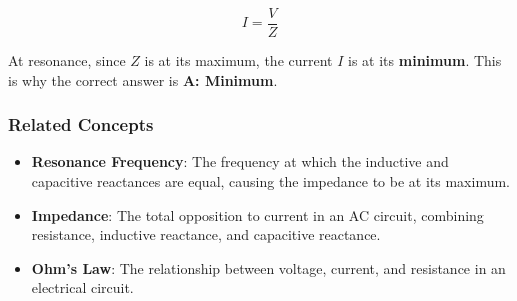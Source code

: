 \[
I = \frac{V}{Z}
\]

At resonance, since \(Z\) is at its maximum, the current \(I\) is at its \textbf{minimum}. This is why the correct answer is \textbf{A: Minimum}.

\subsubsection{Related Concepts}
\begin{itemize}
    \item \textbf{Resonance Frequency}: The frequency at which the inductive and capacitive reactances are equal, causing the impedance to be at its maximum.
    \item \textbf{Impedance}: The total opposition to current in an AC circuit, combining resistance, inductive reactance, and capacitive reactance.
    \item \textbf{Ohm's Law}: The relationship between voltage, current, and resistance in an electrical circuit.
\end{itemize}

